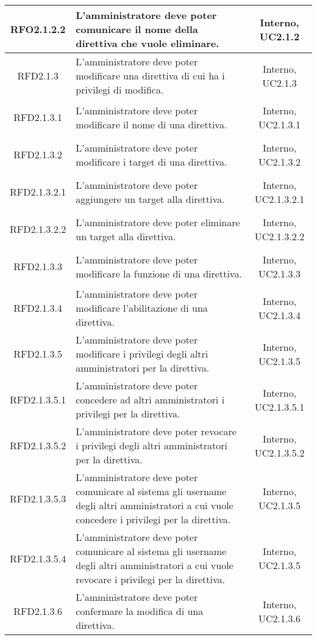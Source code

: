 \begin{longtable}{|c|>{\centering}m{7cm}|c|}
\hypertarget{RFO2.1.2.2}{RFO2.1.2.2} & L'amministratore deve poter comunicare il nome della direttiva che vuole eliminare. & Interno, UC2.1.2\\ \hline
\hypertarget{RFD2.1.3}{RFD2.1.3} & L'amministratore deve poter modificare una direttiva di cui ha i privilegi di modifica. & Interno, UC2.1.3\\ \hline
\hypertarget{RFD2.1.3.1}{RFD2.1.3.1} & L'amministratore deve poter modificare il nome di una direttiva. & Interno, UC2.1.3.1\\ \hline
\hypertarget{RFD2.1.3.2}{RFD2.1.3.2} & L'amministratore deve poter modificare i target di una direttiva. & Interno, UC2.1.3.2\\ \hline
\hypertarget{RFD2.1.3.2.1}{RFD2.1.3.2.1} & L'amministratore deve poter aggiungere un target alla direttiva. & Interno, UC2.1.3.2.1\\ \hline
\hypertarget{RFD2.1.3.2.2}{RFD2.1.3.2.2} & L'amministratore deve poter eliminare un target alla direttiva. & Interno, UC2.1.3.2.2\\ \hline
\hypertarget{RFD2.1.3.3}{RFD2.1.3.3} & L'amministratore deve poter modificare la funzione di una direttiva. & Interno, UC2.1.3.3\\ \hline
\hypertarget{RFD2.1.3.4}{RFD2.1.3.4} & L'amministratore deve poter modificare l'abilitazione di una direttiva. & Interno, UC2.1.3.4\\ \hline
\hypertarget{RFD2.1.3.5}{RFD2.1.3.5} & L'amministratore deve poter modificare i privilegi degli altri amministratori per la direttiva. & Interno, UC2.1.3.5\\ \hline
\hypertarget{RFD2.1.3.5.1}{RFD2.1.3.5.1} & L'amministratore deve poter concedere ad altri amministratori i privilegi per la direttiva. & Interno, UC2.1.3.5.1\\ \hline
\hypertarget{RFD2.1.3.5.2}{RFD2.1.3.5.2} & L'amministratore deve poter revocare i privilegi degli altri amministratori per la direttiva. & Interno, UC2.1.3.5.2\\ \hline
\hypertarget{RFD2.1.3.5.3}{RFD2.1.3.5.3} & L'amministratore deve poter comunicare al sistema gli username degli altri amministratori a cui vuole concedere i privilegi per la direttiva. & Interno, UC2.1.3.5\\ \hline
\hypertarget{RFD2.1.3.5.4}{RFD2.1.3.5.4} & L'amministratore deve poter comunicare al sistema gli username degli altri amministratori a cui vuole revocare i privilegi per la direttiva. & Interno, UC2.1.3.5\\ \hline
\hypertarget{RFD2.1.3.6}{RFD2.1.3.6} & L'amministratore deve poter confermare la modifica di una direttiva. & Interno, UC2.1.3.6\\ \hline

\end{longtable}
